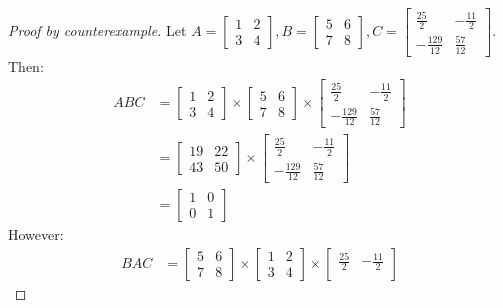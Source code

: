 \documentclass[11pt]{scrartcl}
\theoremstyle{dotlessP}
\theoremstyle{dotlessN}
\begin{document}
\begin{proof}
	[Proof by counterexample]
	Let $A = 
\begin{bmatrix}
	1 & 2 \\
	3 & 4
\end{bmatrix}
	, B = 
\begin{bmatrix}
	5 & 6 \\
	7 & 8
\end{bmatrix}, C =
\begin{bmatrix}
	\frac{25}{2} & -\frac{11}{2} \\
	-\frac{129}{12} & \frac{57}{12}
\end{bmatrix}
	$. Then:
	\begin{align*}
		ABC &= 
		\begin{bmatrix}
			1 & 2 \\
			3 & 4
		\end{bmatrix} \times
		\begin{bmatrix}
			5 & 6 \\
			7 & 8
		\end{bmatrix} \times
\begin{bmatrix}
	\frac{25}{2} & -\frac{11}{2} \\
	-\frac{129}{12} & \frac{57}{12}
\end{bmatrix} \\
			&= 
			\begin{bmatrix}
				19	& 22 \\
				43	& 50
			\end{bmatrix} \times
\begin{bmatrix}
	\frac{25}{2} & -\frac{11}{2} \\
	-\frac{129}{12} & \frac{57}{12}
\end{bmatrix} \\
			&= 
			\begin{bmatrix}
				1 & 0 \\
				0 & 1
			\end{bmatrix}
	\end{align*}
	However:
	\begin{align*}
		BAC &= 
		\begin{bmatrix}
			5 & 6 \\
			7 & 8
		\end{bmatrix} \times
		\begin{bmatrix}
			1 & 2 \\
			3 & 4
		\end{bmatrix} \times
\begin{bmatrix}
	\frac{25}{2} & -\frac{11}{2} \\

\end{bmatrix}
\end{align*}
\end{proof}
\end{document}
